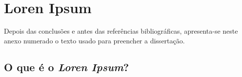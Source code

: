 \chapter{Loren Ipsum}
Depois das conclusões e antes das referências bibliográficas,
apresenta-se neste anexo numerado o texto usado para preencher a
dissertação.

\section{O que é o \emph{Loren Ipsum}?}


